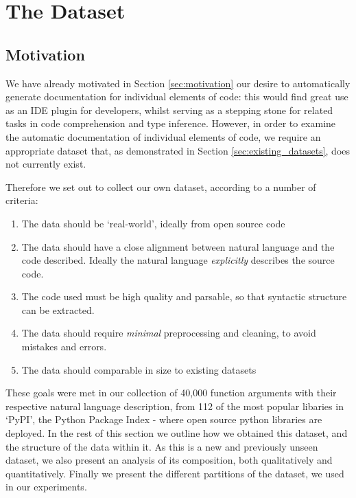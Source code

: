 \chapter{The Dataset}
\label{the_dataset}

\section{Motivation}

We have already motivated in Section \ref{sec:motivation} our desire to automatically generate documentation for individual elements of code: this would find great use as an IDE plugin for developers, whilst serving as a stepping stone for related tasks in code comprehension and type inference.
However, in order to examine the automatic documentation of individual elements of code, we require an appropriate dataset that, as demonstrated in Section \ref{sec:existing_datasets}, does not currently exist.

Therefore we set out to collect our own dataset, according to a number of criteria:

\begin{enumerate}
    \item The data should be `real-world', ideally from open source code
    \item The data should have a close alignment between natural language and the code described. Ideally the natural language \textit{explicitly} describes the source code.
    \item The code used must be high quality and parsable, so that syntactic structure can be extracted.
    \item The data should require \textit{minimal} preprocessing and cleaning, to avoid mistakes and errors.
    \item The data should comparable in size to existing datasets
\end{enumerate}

These goals were met in our collection of 40,000 function arguments with their respective natural language description, from 112 of the most popular libaries in `PyPI', the Python Package Index - where open source python libraries are deployed. In the rest of this section we outline how we obtained this dataset, and the structure of the data within it. As this is a new and previously unseen dataset, we also present an analysis of its composition, both qualitatively and quantitatively.
Finally we present the different partitions of the dataset, we used in our experiments.


